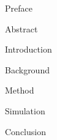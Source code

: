 \documentclass{article}
\begin{document}
\frontmatter
{Preface}

{Abstract}
\newpage

\singlespacing
\tableofcontents
\doublespacing


\newpage
\listoffigures
\newpage
\printnoidxglossaries

\mainmatter

{Introduction}

{Background}

{Method}

{Simulation}

{Conclusion}




\newpage
\printbibliography[heading = bibintoc, title = References]    %


\end{document}
